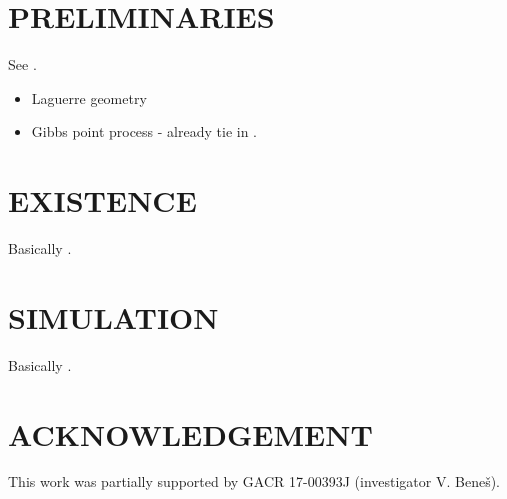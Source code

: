 \documentclass{kybernetika}
\begin{document}
\section{PRELIMINARIES}
See \cite{D17}.
\begin{itemize}
\item Laguerre geometry
\item Gibbs point process - already tie in \cite{DDG12}.
\end{itemize}

\section{EXISTENCE}
Basically \cite{DDG12}.


\section{SIMULATION}
Basically \cite{DL11}.

\section*{ACKNOWLEDGEMENT}
\small
This work was partially supported by GACR 17-00393J (investigator V. Bene\v{s}). 

\makesubmdate
\end{document}
